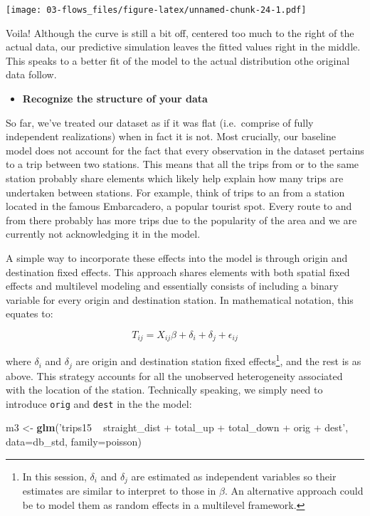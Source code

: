 \documentclass[]{book}
\newenvironment{Shaded}{\begin{snugshade}}{\end{snugshade}}
\newcommand{\DataTypeTok}[1]{\textcolor[rgb]{0.13,0.29,0.53}{#1}}
\newcommand{\KeywordTok}[1]{\textcolor[rgb]{0.13,0.29,0.53}{\textbf{#1}}}
\newcommand{\NormalTok}[1]{#1}
\newcommand{\StringTok}[1]{\textcolor[rgb]{0.31,0.60,0.02}{#1}}
\providecommand{\tightlist}{%
  \setlength{\itemsep}{0pt}\setlength{\parskip}{0pt}}
\let\rmarkdownfootnote\footnote%
\def\footnote{\protect\rmarkdownfootnote}
\begin{document}
\texttt{[image: 03-flows\_files/figure-latex/unnamed-chunk-24-1.pdf]}

Voila! Although the curve is still a bit off, centered too much to the right of the actual data, our predictive simulation leaves the fitted values right in the middle. This speaks to a better fit of the model to the actual distribution othe original data follow.

\begin{itemize}
\tightlist
\item
  \textbf{Recognize the structure of your data}
\end{itemize}

So far, we've treated our dataset as if it was flat (i.e.~comprise of fully independent realizations) when in fact it is not. Most crucially, our baseline model does not account for the fact that every observation in the dataset pertains to a trip between two stations. This means that all the trips from or to the same station probably share elements which likely help explain how many trips are undertaken between stations. For example, think of trips to an from a station located in the famous Embarcadero, a popular tourist spot. Every route to and from there probably has more trips due to the popularity of the area and we are currently not acknowledging it in the model.

A simple way to incorporate these effects into the model is through origin and destination fixed effects. This approach shares elements with both spatial fixed effects and multilevel modeling and essentially consists of including a binary variable for every origin and destination station. In mathematical notation, this equates to:

\[
T_{ij} = X_{ij}\beta + \delta_i + \delta_j + \epsilon_{ij}
\]

where \(\delta_i\) and \(\delta_j\) are origin and destination station fixed effects\footnote{In this session, \(\delta_i\) and \(\delta_j\) are estimated as independent variables so their estimates are similar to interpret to those in \(\beta\). An alternative approach could be to model them as random effects in a multilevel framework.}, and the rest is as above. This strategy accounts for all the unobserved heterogeneity associated with the location of the station. Technically speaking, we simply need to introduce \texttt{orig} and \texttt{dest} in the the model:

\begin{Shaded}
\begin{Highlighting}[]
\NormalTok{m3 <-}\StringTok{ }\KeywordTok{glm}\NormalTok{(}\StringTok{'trips15 ~ straight_dist + total_up + total_down + orig + dest'}\NormalTok{, }
          \DataTypeTok{data=}\NormalTok{db_std,}
          \DataTypeTok{family=}\NormalTok{poisson)}
\end{Highlighting}
\end{Shaded}
\end{document}
